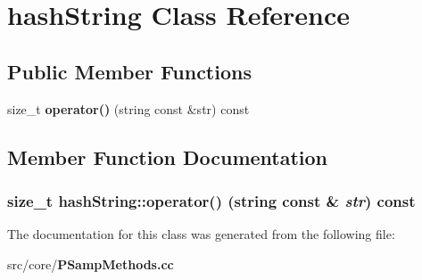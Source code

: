 \section{hash\-String Class Reference}
\label{classhashString}
\subsection*{Public Member Functions}
\begin{CompactItemize}
\item 
size\_\-t {\bf operator()} (string const \&str) const 
\end{CompactItemize}


\subsection{Member Function Documentation}
\subsubsection{\setlength{\rightskip}{0pt plus 5cm}size\_\-t hash\-String::operator() (string const \& {\em str}) const\hspace{0.3cm}{\tt  [inline]}}\label{classhashString_5284c97745d406f4c7f2abbf94837d58}




The documentation for this class was generated from the following file:\begin{CompactItemize}
\item 
src/core/{\bf PSamp\-Methods.cc}\end{CompactItemize}
